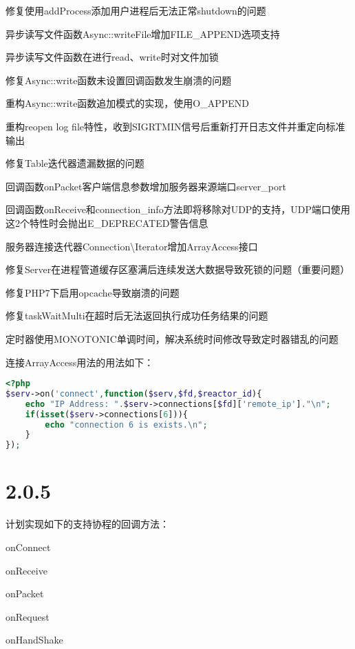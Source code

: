 \begin{compactitem}
\item 修复使用addProcess添加用户进程后无法正常shutdown的问题
\item 异步读写文件函数Async::writeFile增加FILE\_APPEND选项支持
\item 异步读写文件函数在进行read、write时对文件加锁
\item 修复Async::write函数未设置回调函数发生崩溃的问题
\item 重构Async::write函数追加模式的实现，使用O\_APPEND
\item 重构reopen log file特性，收到SIGRTMIN信号后重新打开日志文件并重定向标准输出
\item 修复Table迭代器遗漏数据的问题
\item 回调函数onPacket客户端信息参数增加服务器来源端口server\_port
\item 回调函数onReceive和connection\_info方法即将移除对UDP的支持，UDP端口使用这2个特性时会抛出E\_DEPRECATED警告信息
\item 服务器连接迭代器Connection\textbackslash Iterator增加ArrayAccess接口
\item 修复Server在进程管道缓存区塞满后连续发送大数据导致死锁的问题（重要问题）
\item 修复PHP7下启用opcache导致崩溃的问题
\item 修复taskWaitMulti在超时后无法返回执行成功任务结果的问题
\item 定时器使用MONOTONIC单调时间，解决系统时间修改导致定时器错乱的问题
\end{compactitem}


连接ArrayAccess用法的用法如下：

\begin{lstlisting}[language=PHP]
<?php
$serv->on('connect',function($serv,$fd,$reactor_id){
    echo "IP Address: ".$serv->connections[$fd]['remote_ip']."\n";
    if(isset($serv->connections[6])){
        echo "connection 6 is exists.\n";
    }
});
\end{lstlisting}



\section{2.0.5}


计划实现如下的支持协程的回调方法：

\begin{compactitem}
\item onConnect
\item onReceive
\item onPacket
\item onRequest
\item onHandShake
\end{compactitem}


